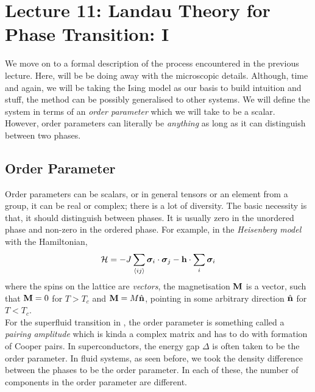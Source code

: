 \section*{Lecture 11: Landau Theory for Phase Transition: I}
We move on to a formal description of the process encountered in the previous lecture. Here, will be be doing away with the microscopic details. Although, time and again, we will be taking the Ising model as our basis to build intuition and stuff, the method can be possibly generalised to other systems. We will define the system in terms of an \textit{order parameter} which we will take to be a scalar. However, order parameters can literally be \textit{anything} as long as it can distinguish between two phases. 
\subsection{Order Parameter}
Order parameters can be scalars, or in general tensors or an element from a group, it can be real or complex; there is a lot of diversity. The basic necessity is that, it should distinguish between phases. It is usually zero in the unordered phase and non-zero in the ordered phase. For example, in the \textit{Heisenberg model} with the Hamiltonian,
\begin{equation}
    \mathcal H = -J \sum\limits_{\left\langle ij \right\rangle} \boldsymbol{\sigma}_i \cdot \boldsymbol{\sigma}_j - \vb{h} \cdot \sum\limits_i \boldsymbol{\sigma}_i
\end{equation}
where the spins on the lattice are \textit{vectors}, the magnetisation $\vb{M}$ is a vector, such that $\vb{M}=0$ for $T>T_c$ and $\vb{M} = M \hat{\vb{n}}$, pointing in some arbitrary direction $\hat{\vb{n}}$ for $T<T_c$.\\[0.2cm]
For the superfluid transition in , the order parameter is something called a \textit{pairing amplitude} which is kinda a complex matrix and has to do with formation of Cooper pairs. In superconductors, the energy gap $\Delta$ is often taken to be the order parameter. In fluid systems, as seen before, we took the density difference between the phases to be the order parameter. In each of these, the number of components in the order parameter are different. 
